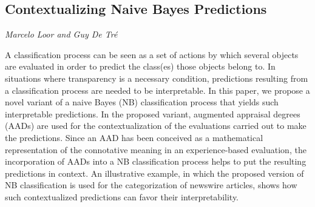 \documentclass[../booklet.tex]{subfiles}
\begin{document}
\subsection[Contextualizing Naive Bayes Predictions. {\it Marcelo Loor and Guy De Tré}]{Contextualizing Naive Bayes Predictions}
 

\begin{center}
  {\it Marcelo Loor and Guy De Tré}
\end{center}

\vskip 0.8cm


A classification process can be seen as a set of actions by which several objects are evaluated in order to predict the class(es) those objects belong to. %
%
In situations where transparency is a necessary condition, predictions resulting from a classification process are needed to be interpretable. %
%
In this paper, we propose a novel variant of a naive Bayes (NB) classification process that yields such interpretable predictions. %
%
In the proposed variant, augmented appraisal degrees (AADs) are used for the contextualization of the evaluations carried out to make the predictions. %
%
Since an AAD has been conceived as a mathematical representation of the connotative meaning in an experience-based evaluation, the incorporation of AADs into a NB classification process helps to put the resulting predictions in context. %
%
An illustrative example, in which the proposed version of NB classification is used for the categorization of newswire articles, shows how such contextualized predictions can favor their interpretability. %
%

\end{document}
